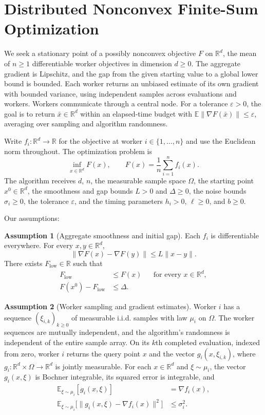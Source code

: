 \documentclass[10pt]{article}
\theoremstyle{definition}
\newtheorem{assumption}{Assumption}
\begin{document}
\section*{Distributed Nonconvex Finite-Sum Optimization}
We seek a stationary point of a possibly nonconvex objective $F$ on $\mathbb{R}^d$, the mean of $n\geq 1$ differentiable worker objectives in dimension $d\geq 0$. The aggregate gradient is Lipschitz, and the gap from the given starting value to a global lower bound is bounded. Each worker returns an unbiased estimate of its own gradient with bounded variance, using independent samples across evaluations and workers. Workers communicate through a central node. For a tolerance $\varepsilon>0$, the goal is to return $\bar{x}\in\mathbb{R}^d$ within an elapsed-time budget with $\mathbb{E}\|\nabla F(\bar{x})\|\leq\varepsilon$, averaging over sampling and algorithm randomness.

Write $f_i:\mathbb{R}^d\to\mathbb{R}$ for the objective at worker $i\in\{1,\ldots,n\}$ and use the Euclidean norm throughout. The optimization problem is
\[
\inf_{x\in\mathbb{R}^d} F(x),
\qquad F(x)=\frac{1}{n}\sum_{i=1}^n f_i(x).
\]
The algorithm receives $d$, $n$, the measurable sample space $\Omega$, the starting point $x^0\in\mathbb{R}^d$, the smoothness and gap bounds $L>0$ and $\Delta\geq 0$, the noise bounds $\sigma_i\geq 0$, the tolerance $\varepsilon$, and the timing parameters $h_i>0$, $\ell\geq 0$, and $b\geq 0$.

Our assumptions:
\begin{assumption}[Aggregate smoothness and initial gap]
Each $f_i$ is differentiable everywhere. For every $x,y\in\mathbb{R}^d$,
\[
\|\nabla F(x)-\nabla F(y)\|\leq L\|x-y\|.
\]
There exists $F_{\mathrm{low}}\in\mathbb{R}$ such that
\[
\begin{aligned}
F_{\mathrm{low}}&\leq F(x) &&\text{for every }x\in\mathbb{R}^d,\\
F(x^0)-F_{\mathrm{low}}&\leq\Delta.
\end{aligned}
\]
\end{assumption}

\begin{assumption}[Worker sampling and gradient estimates]
Worker $i$ has a sequence $(\xi_{i,k})_{k\geq 0}$ of measurable i.i.d. samples with law $\mu_i$ on $\Omega$. The worker sequences are mutually independent, and the algorithm's randomness is independent of the entire sample array. On its $k$th completed evaluation, indexed from zero, worker $i$ returns the query point $x$ and the vector $g_i(x,\xi_{i,k})$, where $g_i:\mathbb{R}^d\times\Omega\to\mathbb{R}^d$ is jointly measurable. For each $x\in\mathbb{R}^d$ and $\xi\sim\mu_i$, the vector $g_i(x,\xi)$ is Bochner integrable, its squared error is integrable, and
\[
\begin{aligned}
\mathbb{E}_{\xi\sim\mu_i}[g_i(x,\xi)]&=\nabla f_i(x),\\
\mathbb{E}_{\xi\sim\mu_i}\bigl[\|g_i(x,\xi)-\nabla f_i(x)\|^2\bigr]&\leq\sigma_i^2.
\end{aligned}
\]
\end{assumption}
\end{document}
